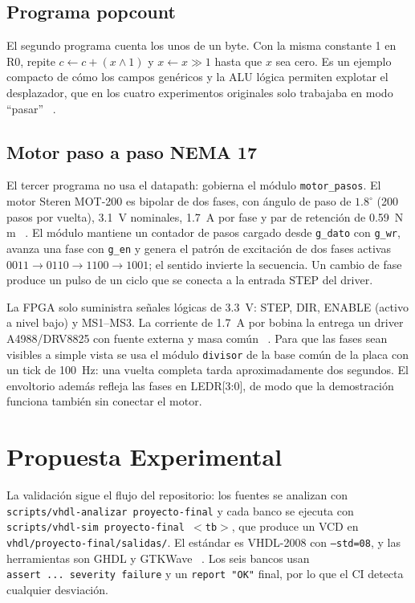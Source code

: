\documentclass[llncs]{llncs}
\begin{document}
\subsection{Programa popcount}

El segundo programa cuenta los unos de un byte. Con la misma constante 1 en
R0, repite $c \leftarrow c + (x \wedge 1)$ y $x \leftarrow x \gg 1$ hasta
que $x$ sea cero. Es un ejemplo compacto de cómo los campos genéricos y la ALU
lógica permiten explotar el desplazador, que en los cuatro experimentos
originales solo trabajaba en modo ``pasar'' ~\cite{kleitz2012,pedroni2008}.

\subsection{Motor paso a paso NEMA 17}

El tercer programa no usa el datapath: gobierna el módulo
\texttt{motor\_pasos}. El motor Steren MOT-200 es bipolar de dos fases, con
ángulo de paso de $1.8^\circ$ (200 pasos por vuelta), 3.1~V nominales,
1.7~A por fase y par de retención de 0.59~N\,m
~\cite{steren2026}. El módulo mantiene un contador de pasos cargado desde
\texttt{g\_dato} con \texttt{g\_wr}, avanza una fase con \texttt{g\_en} y
genera el patrón de excitación de dos fases activas
$0011 \rightarrow 0110 \rightarrow 1100 \rightarrow 1001$; el sentido invierte
la secuencia. Un cambio de fase produce un pulso de un ciclo que se conecta a
la entrada STEP del driver.

La FPGA solo suministra señales lógicas de 3.3~V: STEP, DIR, ENABLE (activo a
nivel bajo) y MS1--MS3. La corriente de 1.7~A por bobina la entrega un driver
A4988/DRV8825 con fuente externa y masa común
~\cite{a4988,terasic2018}. Para que las fases sean visibles a simple vista se
usa el módulo \texttt{divisor} de la base común de la placa con un tick de
100~Hz: una vuelta completa tarda aproximadamente dos segundos. El envoltorio
además refleja las fases en LEDR[3:0], de modo que la demostración funciona
también sin conectar el motor.

\section{Propuesta Experimental}
\label{sec:propuesta}

La validación sigue el flujo del repositorio: los fuentes se analizan con
\texttt{scripts/vhdl-analizar proyecto-final} y cada banco se ejecuta con
\texttt{scripts/vhdl-sim proyecto-final $<$tb$>$}, que produce un VCD en
\texttt{vhdl/proyecto-final/salidas/}. El estándar es VHDL-2008 con
\texttt{--std=08}, y las herramientas son GHDL y GTKWave
~\cite{ghdl-docs,gtkwave-docs}. Los seis bancos usan
\texttt{assert~...~severity~failure} y un \texttt{report~"OK"} final, por lo
que el CI detecta cualquier desviación.
\end{document}
